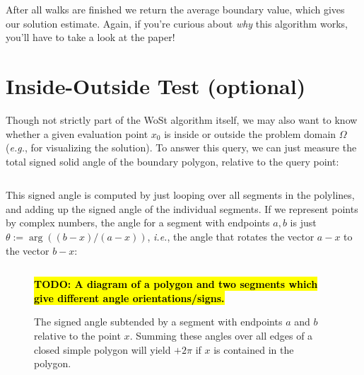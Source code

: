 \documentclass{article}
\newcommand{\todo}[1]{\textbf{\hl{TODO: #1}}}
\newcommand{\eg}{\emph{e.g.}} %
\newcommand{\ie}{\emph{i.e.}} %
\renewcommand{\vec}[1]{#1}
\begin{document}
\inputminted[fontsize=\small,linenos,firstline=150,lastline=157,bgcolor=bg]{cpp}{../code/WoStLaplace2D.cpp}

After all walks are finished we return the average boundary value, which gives our solution estimate.  Again, if you're curious about \emph{why} this algorithm works, you'll have to take a look at the paper!




\appendix

\section{Inside-Outside Test (optional)}
\label{sec:InsideOutsideTest}

Though not strictly part of the WoSt algorithm itself, we may also want to know whether a given evaluation point \(\vec{x}_0\) is inside or outside the problem domain \(\Omega\) (\eg, for visualizing the solution).  To answer this query, we can just measure the total signed solid angle of the boundary polygon, relative to the query point:

\inputminted[fontsize=\small,linenos,firstline=187,lastline=198,bgcolor=bg]{cpp}{../code/WoStLaplace2D.cpp}

This signed angle is computed by just looping over all segments in the polylines, and adding up the signed angle of the individual segments.  If we represent points by complex numbers, the angle for a segment with endpoints \(\vec{a},\vec{b}\) is just \(\theta := \arg((\vec{b}-\vec{x})/(\vec{a}-\vec{x}))\), \ie, the angle that rotates the vector \(\vec{a}-\vec{x}\) to the vector \(\vec{b}-\vec{x}\):

\inputminted[fontsize=\small,linenos,firstline=176,lastline=185,bgcolor=bg]{cpp}{../code/WoStLaplace2D.cpp}

\begin{figure}[h!]
   \todo{A diagram of a polygon and two segments which give different angle orientations/signs.}
   \caption{The signed angle subtended by a segment with endpoints \(\vec{a}\) and \(\vec{b}\) relative to the point \(\vec{x}\).  Summing these angles over all edges of a closed simple polygon will yield \(+2\pi\) if \(\vec{x}\) is contained in the polygon.}
\end{figure}
\end{document}
